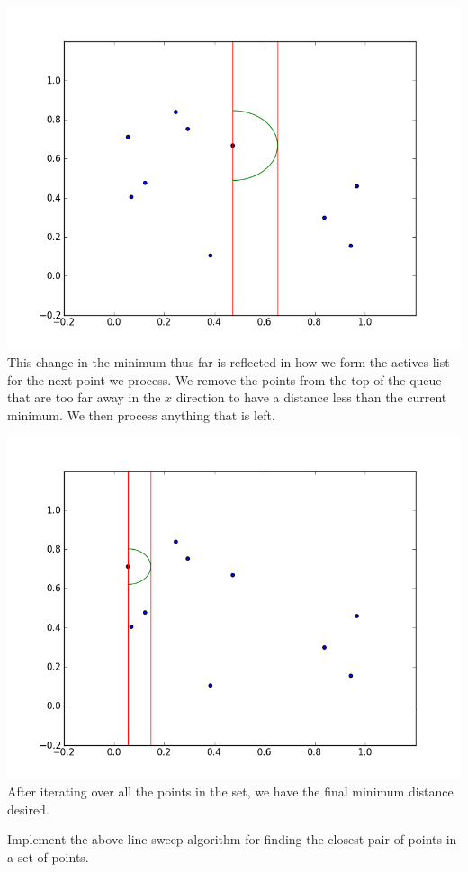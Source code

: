 \includegraphics[width = \textwidth]{simple2.png}
This change in the minimum thus far is reflected in how we form the actives list for the next point we process. 
We remove the points from the top of the queue that are too far away in the $x$ direction to have a distance less than the current minimum. 
We then process anything that is left.

\includegraphics[width = \textwidth]{simple8.png}
After iterating over all the points in the set, we have the final minimum distance desired.

\begin{problem}
Implement the above line sweep algorithm for finding the closest pair of points in a set of points.
\end{problem}

